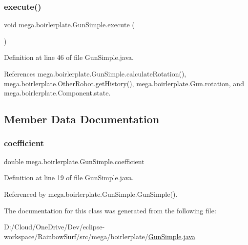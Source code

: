 \subsubsection{\texorpdfstring{execute()}{execute()}}
{\footnotesize\ttfamily void mega.\+boirlerplate.\+Gun\+Simple.\+execute (\begin{DoxyParamCaption}{ }\end{DoxyParamCaption})}



Definition at line 46 of file Gun\+Simple.\+java.



References mega.\+boirlerplate.\+Gun\+Simple.\+calculate\+Rotation(), mega.\+boirlerplate.\+Other\+Robot.\+get\+History(), mega.\+boirlerplate.\+Gun.\+rotation, and mega.\+boirlerplate.\+Component.\+state.



\subsection{Member Data Documentation}
\mbox{\label{classmega_1_1boirlerplate_1_1_gun_simple_aad9bb14d4a0c98bca3ddad45941f8fb5}} 
\subsubsection{\texorpdfstring{coefficient}{coefficient}}
{\footnotesize\ttfamily double mega.\+boirlerplate.\+Gun\+Simple.\+coefficient\hspace{0.3cm}{\ttfamily [private]}}



Definition at line 19 of file Gun\+Simple.\+java.



Referenced by mega.\+boirlerplate.\+Gun\+Simple.\+Gun\+Simple().



The documentation for this class was generated from the following file\+:\begin{DoxyCompactItemize}
\item 
D\+:/\+Cloud/\+One\+Drive/\+Dev/eclipse-\/workspace/\+Rainbow\+Surf/src/mega/boirlerplate/\hyperlink{_gun_simple_8java}{Gun\+Simple.\+java}\end{DoxyCompactItemize}
